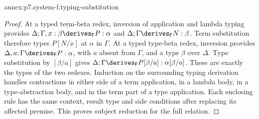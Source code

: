 \begin{annexitem}{annex:p7.system-f.typing-substitution}
\begin{proof}
At a typed term-beta redex, inversion of application and lambda typing
provides \(\Delta;\Gamma,x:\beta\derives_{\mathsf F}P:\alpha\)
and \(\Delta;\Gamma\derives_{\mathsf F}N:\beta\). Term substitution
therefore types \(P[N/x]\) at \(\alpha\) in \(\Gamma\).
At a typed type-beta redex, inversion provides
\(\Delta,a;\Gamma\derives_{\mathsf F}P:\alpha\), with \(a\) absent
from \(\Gamma\), and a type \(\beta\) over \(\Delta\). Type
substitution by \([\beta/a]\) gives
\(\Delta;\Gamma\derives_{\mathsf F}P[\beta/a]:\alpha[\beta/a]\).
These are exactly the types of the two redexes.
Induction on the surrounding typing derivation handles contractions in
either side of a term application, in a lambda body, in a type-abstraction
body, and in the term part of a type application. Each enclosing rule has
the same context, result type and side conditions after replacing its
affected premise. This proves subject reduction for the full relation.
\end{proof}
\end{annexitem}

